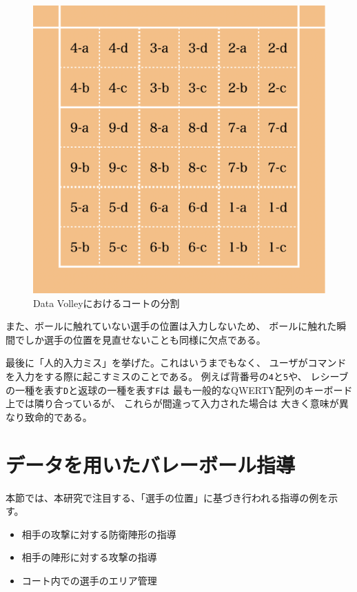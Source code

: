 \documentclass[a4j, fleqn, 12pt]{jsreport}
\begin{document}
        \begin{figure}[ht]
            \centering
            \includegraphics[width=0.8\hsize]{images/areas.png}
            \caption{Data Volleyにおけるコートの分割}
            \label{fig:area}
        \end{figure}

        また、ボールに触れていない選手の位置は入力しないため、
        ボールに触れた瞬間でしか選手の位置を見直せないことも同様に欠点である。

        最後に「人的入力ミス」を挙げた。これはいうまでもなく、
        ユーザがコマンドを入力をする際に起こすミスのことである。
        例えば背番号の\verb|4|と\verb|5|や、
        レシーブの一種を表す\verb|D|と返球の一種を表す\verb|F|は
        最も一般的なQWERTY配列のキーボード上では隣り合っているが、
        これらが間違って入力された場合は
        大きく意味が異なり致命的である。

    \section{データを用いたバレーボール指導}
        本節では、本研究で注目する、「選手の位置」に基づき行われる指導の例を示す。

        \begin{itemize}
            \item 相手の攻撃に対する防衛陣形の指導
            \item 相手の陣形に対する攻撃の指導
            \item コート内での選手のエリア管理
        \end{itemize}
\end{document}

